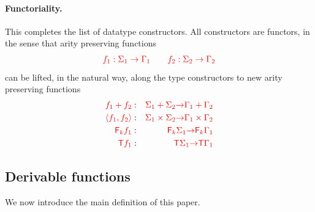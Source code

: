 \paragraph*{Functoriality.} This completes the list of  datatype constructors.  All constructors are functors, in the sense  that  arity preserving functions
\begin{align*}
{\color{red}{f_1 : \Sigma_1 \to \Gamma_1 \qquad f_2 : \Sigma_2 \to \Gamma_2}}
\end{align*}       
can be lifted, in the natural way, along the type constructors to new arity preserving  functions
\begin{eqnarray}
\label{eq:liftplus}{\color{red}{f_1 + f_2 }} &:& {\color{red}{\Sigma_1 + \Sigma_2}} {\color{red}{\to}} {\color{red}{\Gamma_1 + \Gamma_2}} \\
{\color{red}{\langle{f_1,f_2}\rangle }} &:& {\color{red}{\Sigma_1 \times\Sigma_2}} {\color{red}{\to}} {\color{red}{\Gamma_1 \times\Gamma_2}}\\
{\color{red}{{\color{red}{\mathsf F_{k}}}f_1 }} &:& {\color{red}{{\color{red}{\mathsf F_{k}}}\Sigma_1}} {\color{red}{\to}} {\color{red}{{\color{red}{\mathsf F_{k}}}\Gamma_1}}\\
\label{eq:liftterm}
{\color{red}{{\color{red}{\mathsf T}}f_1 }} &:& {\color{red}{{\color{red}{\mathsf T}}\Sigma_1}} {\color{red}{\to}} {\color{red}{{\color{red}{\mathsf T}}\Gamma_1}}
\end{eqnarray}





\subsection{Derivable functions}
We now introduce the main  definition of this paper.

